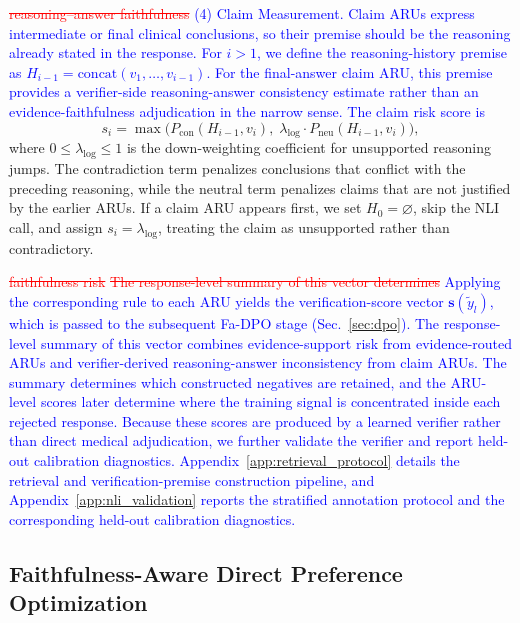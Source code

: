 \documentclass[a4paper,fleqn,doubleblind]{cas-sc}
\DeclareRobustCommand{\deleted}[1]{\textcolor{red}{\sout{#1}}}
\DeclareRobustCommand{\added}[1]{\textcolor{blue}{#1}}
\begin{document}
\deleted{reasoning--answer faithfulness}
\added{(4) Claim Measurement.}
\added{Claim ARUs express intermediate or final clinical conclusions, so their premise should be the reasoning already stated in the response. For $i>1$, we define the reasoning-history premise as $H_{i-1}=\mathrm{concat}(v_1,\dots,v_{i-1})$. For the final-answer claim ARU, this premise provides a verifier-side reasoning-answer consistency estimate rather than an evidence-faithfulness adjudication in the narrow sense. The claim risk score is}
\begin{equation}
\label{eq:logic_score}
    s_i = \max \Big( P_{\text{con}}(H_{i-1}, v_i),\; \lambda_{\text{log}} \cdot P_{\text{neu}}(H_{i-1}, v_i) \Big),
\end{equation}
where $0 \le \lambda_{\text{log}} \le 1$ is the down-weighting coefficient for unsupported reasoning jumps. The contradiction term penalizes conclusions that conflict with the preceding reasoning, while the neutral term penalizes claims that are not justified by the earlier ARUs. If a claim ARU appears first, we set $H_0=\varnothing$, skip the NLI call, and assign $s_i=\lambda_{\text{log}}$, treating the claim as unsupported rather than contradictory.

\deleted{faithfulness risk}
\deleted{The response-level summary of this vector determines}
\added{Applying the corresponding rule to each ARU yields the verification-score vector $\mathbf{s}(\tilde{y}_l)$, which is passed to the subsequent Fa-DPO stage (Sec.~\ref{sec:dpo}). The response-level summary of this vector combines evidence-support risk from evidence-routed ARUs and verifier-derived reasoning-answer inconsistency from claim ARUs. The summary determines which constructed negatives are retained, and the ARU-level scores later determine where the training signal is concentrated inside each rejected response. Because these scores are produced by a learned verifier rather than direct medical adjudication, we further validate the verifier and report held-out calibration diagnostics.}
\added{Appendix~\ref{app:retrieval_protocol} details the retrieval and verification-premise construction pipeline, and Appendix~\ref{app:nli_validation} reports the stratified annotation protocol and the corresponding held-out calibration diagnostics.}


\subsection{Faithfulness-Aware Direct Preference Optimization}
\end{document}
